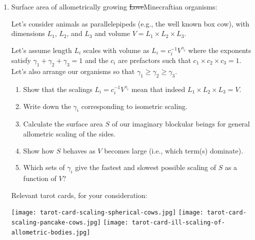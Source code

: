 \begin{enumerate}

\item
  \label{q1}Surface area of allometrically growing \sout{Love}Minecraftian organisms:

  Let's consider animals as parallelepipeds (e.g., the well known box cow),
  with dimensions $L_1$, $L_2$, and $L_3$
  and volume $V = L_1 \times L_2 \times L_3$.

  Let's assume 
  length $L_{i}$
  scales with volume as 
  $
  L_{i}
  =
  c_{i}^{-1}
  V^{\gamma_{i}}
  $
  where the exponents satisfy
  $
  \gamma_{1}
  +
  \gamma_{2}
  +
  \gamma_{3}
  =
  1
  $
  and the $c_{i}$ are prefactors such that
  $c_1 \times c_2 \times c_3 = 1$.
  Let's also arrange our organisms so that
  $
  \gamma_{1}
  \ge
  \gamma_{2}
  \ge
  \gamma_{3}
  $.

  \begin{enumerate}
  \item 
    Show that the scalings 
    $
    L_{i}
    =
    c_{i}^{-1} V^{\gamma_{i}}
    $
    mean that indeed 
    $
    L_{1}
    \times
    L_{2}
    \times
    L_{3}
    =
    V
    $.
  \item 
    Write down the $\gamma_{i}$ corresponding to isometric scaling.
  \item 
    Calculate the surface area $S$ of our imaginary blockular beings for general
    allometric scaling of the sides.
  \item 
    Show how $S$ behaves as $V$ becomes large (i.e., which term(s) dominate).
  \item 
    Which sets of $\gamma_{i}$ give the fastest and slowest possible
    scaling of $S$ as a function of $V$?
  \end{enumerate}


  Relevant tarot cards, for your consideration:
  
  \texttt{[image: tarot-card-scaling-spherical-cows.jpg]}
  \texttt{[image: tarot-card-scaling-pancake-cows.jpg]}
  \texttt{[image: tarot-card-ill-scaling-of-allometric-bodies.jpg]}

  
   \solutionstart
   

\end{enumerate}
